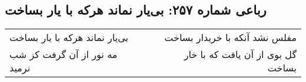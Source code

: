 \begin{center}
\section*{رباعی شماره ۲۵۷: بی‌یار نماند هرکه با یار بساخت}
\label{sec:0257}
\begin{longtable}{l p{0.5cm} r}
بی‌یار نماند هرکه با یار بساخت
&&
مفلس نشد آنکه با خریدار بساخت
\\
مه نور از آن گرفت کز شب نرمید
&&
گل بوی از آن یافت که با خار بساخت
\\
\end{longtable}
\end{center}
